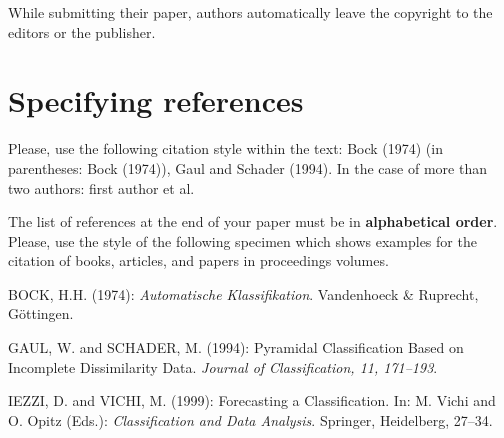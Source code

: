 \documentclass[runningheads]{d:/latex/gfkl2002}
\begin{document}
While submitting their paper, authors automatically leave
the copyright to the editors or the publisher.

\section{Specifying references}

Please, use the following citation style within the text: Bock (1974) 
(in parentheses: Bock (1974)), Gaul and Schader (1994). 
In the case of more than two authors: first author et al.

The list of references at the end of your paper must be in {\bf 
alphabetical order}. 
Please, use the style of the following specimen which shows examples 
for the citation of books, articles, and papers in proceedings volumes.

\begin{thebibliography}{1}

\item[]
BOCK, H.H. (1974): 
{\em Automatische Klassifikation}. 
Vandenhoeck \& Ruprecht, G\"ottingen. 

\item[]
GAUL, W. and SCHADER, M. (1994): 
Pyramidal Classification Based on Incomplete Dissimilarity Data. 
{\em Journal of Classification, 11, 171--193}. 

\item[]
IEZZI, D. and VICHI, M. (1999): 
Forecasting a Classification. 
In: M. Vichi and O. Opitz (Eds.): 
{\em Classification and Data Analysis}. 
Springer, Heidelberg, 27--34.

\end{thebibliography}
\end{document}
